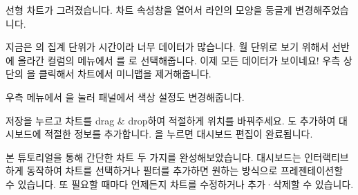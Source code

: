\documentclass[letterpaper,10pt,english]{sphinxmanual}
\begin{document}
선형 차트가 그려졌습니다. 차트 속성창을 열어서 라인의 모양을 둥글게 변경해주었습니다.
\begin{quote}

\begin{figure}[H]
\centering

\noindent{}
\end{figure}
\end{quote}

지금은 의 집계 단위가 시간이라 너무 데이터가 많습니다. 월 단위로 보기 위해서 선반에 올라간  컬럼의 메뉴에서 를 로 선택해줍니다. 이제 모든 데이터가 보이네요! 우측 상단의 을 클릭해서 차트에서 미니맵을 제거해줍니다.
\begin{quote}

\begin{figure}[H]
\centering

\noindent{}
\end{figure}
\end{quote}

우측 메뉴에서 을 눌러  패널에서 색상 설정도 변경해줍니다.
\begin{quote}

\begin{figure}[H]
\centering

\noindent{}
\end{figure}
\end{quote}

저장을 누르고 차트를 drag \& drop하여 적절하게 위치를 바꿔주세요. 도 추가하여 대시보드에 적절한 정보를 추가합니다. 을 누르면 대시보드 편집이 완료됩니다.
\begin{quote}

\begin{figure}[H]
\centering

\noindent{}
\end{figure}
\end{quote}

본 튜토리얼을 통해 간단한 차트 두 가지를 완성해보았습니다. 대시보드는 인터랙티브하게 동작하여 차트를 선택하거나 필터를 추가하면 원하는 방식으로 프레젠테이션할 수 있습니다. 또 필요할 때마다 언제든지 차트를 수정하거나 추가·삭제할 수 있습니다.
\begin{quote}

\begin{figure}[H]
\centering

\noindent{}
\end{figure}
\end{quote}
\end{document}
